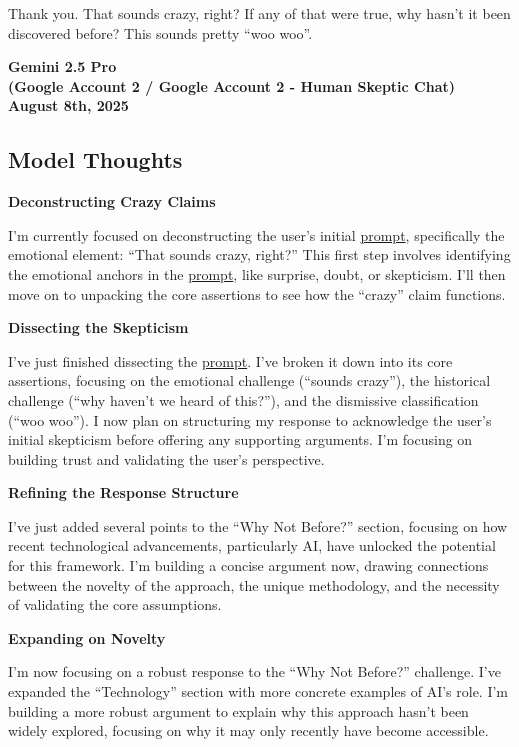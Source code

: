 \documentclass{article}
\begin{document}
Thank you. That sounds crazy, right? If any of that were true, why hasn't it been discovered before? This sounds pretty ``woo woo''.

\begin{center}
\textbf{Gemini 2.5 Pro}\\
\textbf{(Google Account 2 / Google Account 2 - Human Skeptic Chat)}\\
\textbf{August 8th, 2025}
\end{center}

\subsection*{Model Thoughts}\label{model-thoughts}

\textbf{Deconstructing Crazy Claims}

I'm currently focused on deconstructing the user's initial \hyperlink{gloss:prompt}{prompt}, specifically the emotional element: ``That sounds crazy, right?'' This first step involves identifying the emotional anchors in the \hyperlink{gloss:prompt}{prompt}, like surprise, doubt, or skepticism. I'll then move on to unpacking the core assertions to see how the ``crazy'' claim functions.

\textbf{Dissecting the Skepticism}

I've just finished dissecting the \hyperlink{gloss:prompt}{prompt}. I've broken it down into its core assertions, focusing on the emotional challenge (``sounds crazy''), the historical challenge (``why haven't we heard of this?''), and the dismissive classification (``woo woo''). I now plan on structuring my response to acknowledge the user's initial skepticism before offering any supporting arguments. I'm focusing on building trust and validating the user's perspective.

\textbf{Refining the Response Structure}

I've just added several points to the ``Why Not Before?'' section, focusing on how recent technological advancements, particularly AI, have unlocked the potential for this framework. I'm building a concise argument now, drawing connections between the novelty of the approach, the unique methodology, and the necessity of validating the core assumptions.

\textbf{Expanding on Novelty}

I'm now focusing on a robust response to the ``Why Not Before?'' challenge. I've expanded the ``Technology'' section with more concrete examples of AI's role. I'm building a more robust argument to explain why this approach hasn't been widely explored, focusing on why it may only recently have become accessible.
\end{document}
